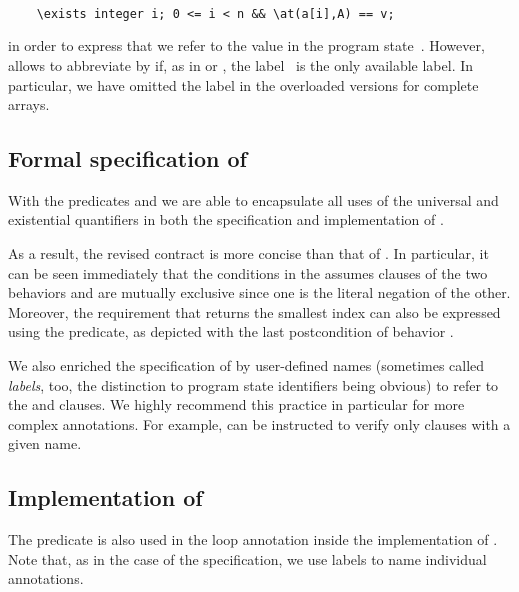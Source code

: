\begin{lstlisting}[style=acsl-block]

    \exists integer i; 0 <= i < n && \at(a[i],A) == v;
\end{lstlisting}

in order to express that we refer to the value  in
the program state~.
However, \acsl allows to abbreviate  by  if, as in
\SomeEqual or \NoneEqual, the label~ is the only available label.
In particular, we have omitted the label in the overloaded versions for complete arrays.


\subsection{Formal specification of \findii}

With the predicates 
and 
we are able to encapsulate all uses of the universal and existential 
quantifiers in both the specification and implementation of \findii.

As a result, the revised contract  is more concise
than that of .
%
In particular, it can be seen immediately that the conditions in the
assumes clauses
of the two behaviors  and  are mutually
exclusive since
one is the literal negation of the other.
Moreover, the requirement that \find returns the smallest index can
also be expressed
using the  predicate, as depicted with the last postcondition of
behavior .



We also enriched the specification of \find by user-defined names
(sometimes called \emph{labels}, too, the distinction to program state identifiers
being obvious)  to refer to
the  and  clauses.
We highly recommend this practice in particular for more complex annotations.
For example, \framac can be instructed to verify only clauses with a
given name.

\clearpage

\subsection{Implementation of \findii}

The predicate \NoneEqual is also used in the loop annotation inside
the implementation of .
Note that, as in the case of the specification, we use labels to name individual annotations.




